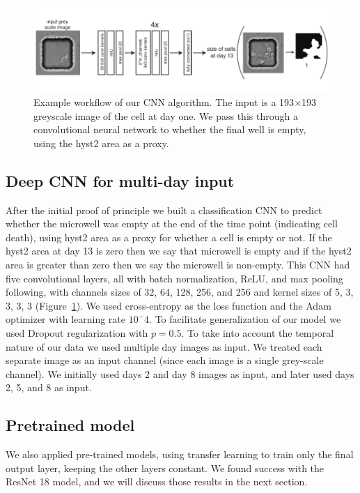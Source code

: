 \documentclass[10pt,twocolumn,letterpaper]{article}
\begin{document}
 \begin{figure}[t!]
\begin{center}
\includegraphics[width=0.8\linewidth]{figures/networkExampleImage_v2.pdf}
\end{center}
   \caption{Example workflow of our CNN algorithm.  The input is a 193$\times$193 greyscale image of the cell at day one.  We pass this through a convolutional neural network to whether the final well is empty, using the hyst2 area as a proxy.}
\label{workflow}
\end{figure}

\subsection{Deep CNN for multi-day input}

After the initial proof of principle we built a classification CNN to predict whether the microwell was empty at the end of the time point (indicating cell death), using hyst2 area as a proxy for whether a cell is empty or not.  If the hyst2 area at day 13 is zero then we say that microwell is empty and if the hyst2 area is greater than zero then we say the microwell is non-empty.  This CNN had five convolutional layers, all with batch normalization, ReLU, and max pooling following, with channels sizes of 32, 64, 128, 256, and 256 and kernel sizes of 5, 3, 3, 3, 3 (Figure~\ref{workflow}).  We used cross-entropy as the loss function and the Adam optimizer with learning rate $10^-4$.   To facilitate generalization of our model we used Dropout regularization with $p = 0.5$.  To take into account the temporal nature of our data we used multiple day images as input.  We treated each separate image as an input channel (since each image is a single grey-scale channel).  We initially used days 2 and day 8 images as input, and later used days 2, 5, and 8 as input.


\subsection{Pretrained model}

We also applied pre-trained models, using transfer learning to train only the final output layer, keeping the other layers constant.  We found success with the ResNet 18 model, and we will discuss those results in the next section.
\end{document}

